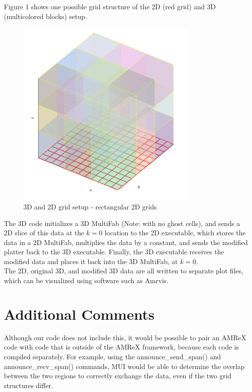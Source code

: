 \documentclass[12pt,letterpaper]{article}
\newcommand{\natwidthpng}{610}
\newcommand{\natheightpng}{642}
\begin{document}
\vspace{0.5cm}
\noindent Figure 1 shows one possible grid structure of the 2D (red grid) and 3D (multicolored blocks) setup.

\begin{figure}[H]
    \centering
    \includegraphics[width=0.80\textwidth,natwidth=\natwidthpng,natheight=\natheightpng]{iface_rect.png}
    \caption{3D and 2D grid setup - rectangular 2D grids}
\end{figure}

\vspace{0.5cm}
\noindent The 3D code initializes a 3D MultiFab (Note: with no ghost cells), and sends a 2D slice of this data at the $k = 0$ location to the 2D executable, which stores the data in a 2D MultiFab, multiplies the data by a constant, and sends the modified platter back to the 3D executable. Finally, the 3D executable receives the modified data and places it back into the 3D MultiFab, at $k = 0$. \\

\vspace{0.5cm}
\noindent The 2D, original 3D, and modified 3D data are all written to separate plot files, which can be visualized using software such as Amrvis. \\

\section*{Additional Comments}

\vspace{0.5cm}
\noindent Although our code does not include this, it would be possible to pair an AMReX code with code that is outside of the AMReX framework, because each code is compiled separately. For example, using the {\selectfont announce\_send\_span()} and {\selectfont announce\_recv\_span()} commands, MUI would be able to determine the overlap between the two regions to correctly exchange the data, even if the two grid structures differ.
\end{document}

